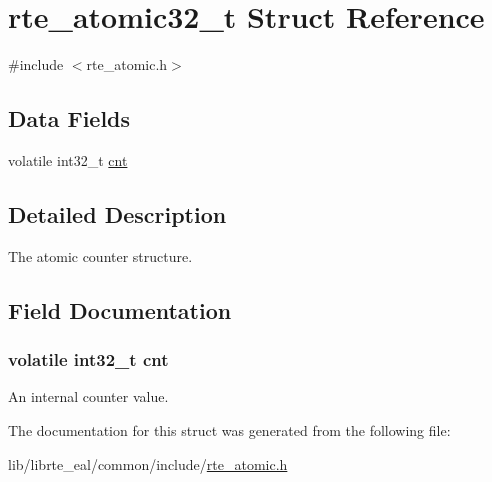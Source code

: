 \hypertarget{structrte__atomic32__t}{}\section{rte\+\_\+atomic32\+\_\+t Struct Reference}
\label{structrte__atomic32__t}


{\ttfamily \#include $<$rte\+\_\+atomic.\+h$>$}

\subsection*{Data Fields}
\begin{DoxyCompactItemize}
\item 
volatile int32\+\_\+t \hyperlink{structrte__atomic32__t_aa6a259db31091b35fd46d2eba71a1112}{cnt}
\end{DoxyCompactItemize}


\subsection{Detailed Description}
The atomic counter structure. 

\subsection{Field Documentation}
\hypertarget{structrte__atomic32__t_aa6a259db31091b35fd46d2eba71a1112}{}
\subsubsection[{cnt}]{\setlength{\rightskip}{0pt plus 5cm}volatile int32\+\_\+t cnt}\label{structrte__atomic32__t_aa6a259db31091b35fd46d2eba71a1112}
An internal counter value. 

The documentation for this struct was generated from the following file\+:\begin{DoxyCompactItemize}
\item 
lib/librte\+\_\+eal/common/include/\hyperlink{rte__atomic_8h}{rte\+\_\+atomic.\+h}\end{DoxyCompactItemize}
